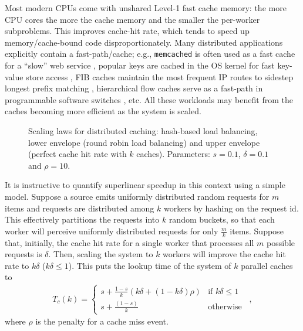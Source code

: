 Most modern CPUs come with unshared Level-1 fast cache memory: the more CPU cores the more the cache memory and the smaller the per-worker subproblems. This improves cache-hit rate, which tends to speed up memory\slash cache-bound code disproportionately. Many distributed applications explicitly contain a fast-path\slash cache; e.g., \texttt{memcached} is often used as a fast cache for a ``slow'' web service \cite{180324,10.5555/1012889.1012894}, popular keys are cached in the OS kernel for fast key-value store access \cite{179747, ghigoff2021bmc}, FIB caches maintain the most frequent IP routes to sidestep longest prefix matching \cite{rottenstreich2016optimal}, hierarchical flow caches serve as a fast-path in programmable software switches \cite{188960}, etc. All these workloads may benefit from the caches becoming more efficient as the system is scaled. %

\begin{figure}
  \centering
  \begin{small}
    
\end{small}
\caption{Scaling laws for distributed caching: hash-based load balancing, lower envelope (round robin load balancing) and upper envelope (perfect cache hit rate with $k$ caches). Parameters: $s=0.1$, $\delta=0.1$ and $\rho=10$.}
  \label{fig:dcache-analysis}
\end{figure}



It is instructive to quantify superlinear speedup in this context using a simple model. Suppose a source emits uniformly distributed random requests for $m$ items and requests are distributed among $k$ workers by hashing on the request id. This effectively partitions the requests into $k$ random buckets, so that each worker will perceive uniformly distributed requests for only $\frac{m}{k}$ items.  Suppose that, initially, the cache hit rate for a single worker that processes all $m$ possible requests is $\delta$. Then, scaling the system to $k$ workers will improve the cache hit rate to $k\delta$ ($k\delta \le 1$). This puts the lookup time of the system of $k$ parallel caches to
\begin{align}\label{eq:dist-cache}
  T_c(k) = \begin{cases} s + \frac{1-s}{k}(k\delta + (1-k\delta)\rho) & \text{if } k\delta \le 1\\s + \frac{(1-s)}{k} & \text{otherwise}\end{cases} \enspace ,
\end{align}
where $\rho$ is the penalty for a cache miss event.

